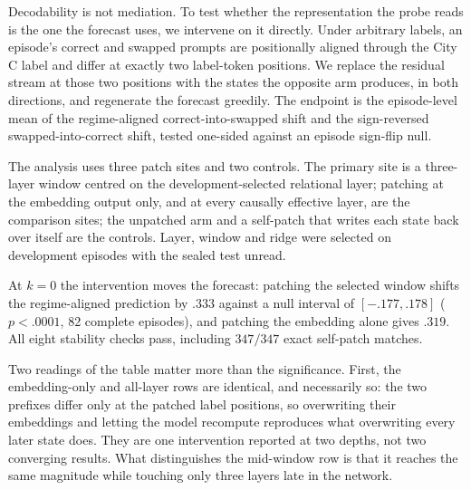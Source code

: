 Decodability is not mediation. To test whether the representation the probe reads
is the one the forecast uses, we intervene on it directly. Under arbitrary labels, an episode's correct and swapped prompts are
positionally aligned through the City C label and differ at exactly two label-token
positions.
We replace the residual stream at those two positions with the states the opposite
arm produces, in both directions, and regenerate the forecast greedily. The
endpoint is the episode-level mean of the regime-aligned correct-into-swapped
shift and the sign-reversed swapped-into-correct shift, tested one-sided against
an episode sign-flip null.

The analysis uses three patch sites and two controls. The primary site is a
three-layer window centred on the development-selected relational layer;
patching at the embedding output only, and at every causally effective layer, are
the comparison sites; the unpatched arm and a self-patch that writes each state
back over itself are the controls. Layer, window and ridge were selected on
development episodes with the sealed test unread.

\begin{center}
\begin{minipage}{\linewidth}
\centering
{}
\label{tab:coin-city-causal-patch}
\small
\setlength{\tabcolsep}{4pt}
\resizebox{\linewidth}{!}{}
\end{minipage}
\end{center}

At $k=0$ the intervention moves the forecast: patching the selected window shifts
the regime-aligned prediction by $.333$ against a null interval of
$[-.177,.178]$ ($p<.0001$, 82 complete episodes), and patching the embedding
alone gives $.319$. All eight stability checks pass, including $347/347$ exact
self-patch matches.

Two readings of the table matter more than the significance. First, the
embedding-only and all-layer rows are identical, and necessarily so: the two
prefixes differ only at the patched label positions, so overwriting their embeddings
and letting the model recompute reproduces what overwriting every later state does. They are one intervention reported at two depths, not two
converging results. What distinguishes the mid-window row is that it reaches the
same magnitude while touching only three layers late in the network.

